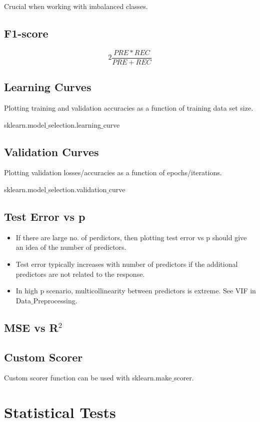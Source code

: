 \documentclass[a4paper, 12pt]{report}
\begin{document}
Crucial when working with imbalanced classes.

\section{F1-score}

$$2 \frac{PRE \ast REC}{PRE + REC}$$


\section{Learning Curves}
Plotting training and validation accuracies as a function of training data set size.

sklearn.model$\_$selection.learning$\_$curve

\section{Validation Curves}
Plotting validation losses/accuracies as a function of epochs/iterations.

sklearn.model$\_$selection.validation$\_$curve

\section{Test Error vs p}
\begin{itemize}
\item If there are large no. of perdictors, then plotting test error vs p should give an idea of the number of predictors.
\item Test error typically increases with number of predictors if the additional predictors are not related to the response.
\item In high p scenario, multicollinearity between predictors is extreme. See VIF in Data$\_$Preprocessing.
\end{itemize}
\section{MSE vs R$^2$}

\section{Custom Scorer}
Custom scorer function can be used with sklearn.make$\_$scorer.
\chapter{Statistical Tests}
\end{document}
